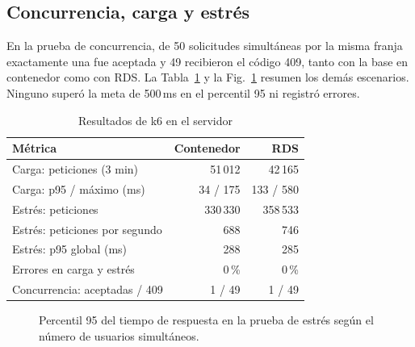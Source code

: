 \documentclass[conference]{IEEEtran}
\begin{document}
\subsection{Concurrencia, carga y estrés}
En la prueba de concurrencia, de 50 solicitudes simultáneas por la misma franja exactamente una fue aceptada y 49 recibieron el código 409, tanto con la base en contenedor como con RDS. La Tabla~\ref{tab:k6} y la Fig.~\ref{fig:estres} resumen los demás escenarios. Ninguno superó la meta de 500\,ms en el percentil 95 ni registró errores.

\begin{table}[t]
\centering
\caption{Resultados de k6 en el servidor}
\label{tab:k6}
\renewcommand{\arraystretch}{1.1}
\begin{tabular}{@{}lrr@{}}
\toprule
\textbf{Métrica} & \textbf{Contenedor} & \textbf{RDS} \\
\midrule
Carga: peticiones (3 min) & 51\,012 & 42\,165 \\
Carga: p95 / máximo (ms) & 34 / 175 & 133 / 580 \\
Estrés: peticiones & 330\,330 & 358\,533 \\
Estrés: peticiones por segundo & 688 & 746 \\
Estrés: p95 global (ms) & 288 & 285 \\
Errores en carga y estrés & 0\,\% & 0\,\% \\
Concurrencia: aceptadas / 409 & 1 / 49 & 1 / 49 \\
\bottomrule
\end{tabular}
\end{table}

\begin{figure}[t]
\centering
{}
\caption{Percentil 95 del tiempo de respuesta en la prueba de estrés según el número de usuarios simultáneos.}
\label{fig:estres}
\end{figure}
\end{document}
